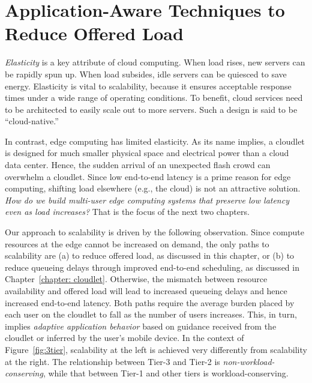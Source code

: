 \chapter{Application-Aware Techniques to Reduce Offered Load}
\label{chapter: load}

{\em Elasticity} is a key attribute of cloud computing.  When load
rises, new servers can be rapidly spun up.  When load subsides, idle
servers can be quiesced to save energy.  Elasticity is vital to
scalability, because it ensures acceptable response times under a wide
range of operating conditions.  To benefit, cloud services need to be
architected to easily scale out to more servers.  Such a design is
said to be ``cloud-native.''

In contrast, edge computing has limited elasticity.  As its name implies, a
cloudlet is designed for much smaller physical space and electrical power than a
cloud data center.  Hence, the sudden arrival of an unexpected flash crowd can
overwhelm a cloudlet.  Since low end-to-end latency is a prime reason for edge
computing, shifting load elsewhere (e.g., the cloud) is not an attractive
solution.  {\em How do we build multi-user edge computing systems that preserve
low latency even as load increases?}  That is the focus of the next two chapters.

Our approach to scalability is driven by the following observation. Since
compute resources at the edge cannot be increased on demand, the only paths to
scalability are (a) to reduce offered load, as discussed in this chapter,
or (b) to reduce queueing delays through improved end-to-end scheduling,
as discussed in Chapter~\ref{chapter: cloudlet}.  Otherwise, the mismatch between
resource availability and offered load will lead to increased queueing delays
and hence increased end-to-end latency.  Both paths require the average burden
placed by each user on the cloudlet to fall as the number of users increases.
This, in turn, implies {\em adaptive application behavior} based on guidance
received from the cloudlet or inferred by the user's mobile device.  In the
context of Figure~\ref{fig:3tier}, scalability at the left is achieved very
differently from scalability at the right.  The relationship between Tier-3 and
Tier-2 is {\em non-workload-conserving}, while that between Tier-1 and other
tiers is workload-conserving.

